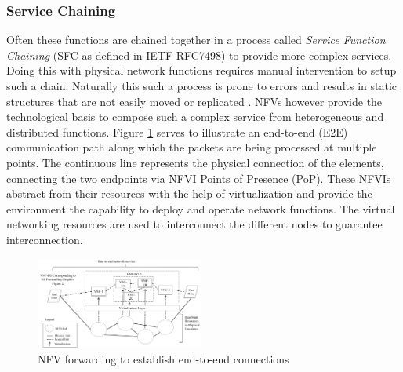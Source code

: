 \subsubsection{Service Chaining}
Often these functions are chained together in a process called \textit{Service Function Chaining} (SFC as defined in IETF RFC7498) to provide more complex services. Doing this with physical network functions requires manual intervention to setup such a chain. Naturally this such a process is prone to errors and results in static structures that are not easily moved or replicated \cite{luizelli2017actual}. NFVs  however provide the technological basis to compose such a complex service from heterogeneous and distributed functions. Figure \ref{img:nfv_forward} serves to illustrate an end-to-end (E2E) communication path along which the packets are being processed at multiple points. The continuous line represents the physical connection of the elements, connecting the two endpoints via NFVI Points of Presence (PoP). These NFVIs abstract from their resources with the help of virtualization and provide the environment the capability to deploy and operate network functions. The virtual networking resources are used to interconnect the different nodes to guarantee interconnection. 

\begin{figure}[h]
	\centering
	\includegraphics[width=0.49\textwidth]{images/nfv_forwarding.png}
	\caption{NFV forwarding to establish end-to-end connections \cite{ etsi1etsi}}
	\label{img:nfv_forward}
\end{figure}

